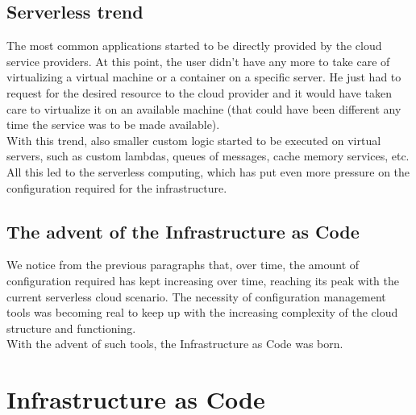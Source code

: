 \subsection{Serverless trend}
The most common applications started to be directly provided by the cloud service providers.
At this point, the user didn't have any more to take care of virtualizing a virtual machine or a container on a specific server.
He just had to request for the desired resource to the cloud provider and it would have taken care to virtualize it on an available machine (that could have been different any time the service was to be made available).\\
With this trend, also smaller custom logic started to be executed on virtual servers, such as custom lambdas, queues of messages, cache memory services, etc.\\
All this led to the serverless computing, which has put even more pressure on the configuration required for the infrastructure.

\subsection{The advent of the Infrastructure as Code}
We notice from the previous paragraphs that, over time, the amount of configuration required has kept increasing over time, reaching its peak with the current serverless cloud scenario.
The necessity of configuration management tools was becoming real to keep up with the increasing complexity of the cloud structure and functioning.\\
With the advent of such tools, the Infrastructure as Code was born.


\section{Infrastructure as Code}

